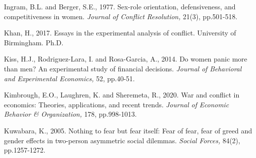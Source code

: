 \documentclass[12pt, letterpaper]{article}
\theoremstyle{plain}
\begin{document}
\begin{thebibliography}{10}



\bibitem{} Ingram, B.L. and Berger, S.E., 1977. Sex-role orientation, defensiveness, and competitiveness in women. \textit{Journal of Conflict Resolution,} 21(3), pp.501-518.


\bibitem{} Khan, H., 2017. Essays in the experimental analysis of conflict. University of Birmingham. Ph.D.

\bibitem{} Kiss, H.J., Rodriguez-Lara, I. and Rosa-Garcia, A., 2014. Do women panic more than men? An experimental study of financial decisions. \textit{Journal of Behavioral and Experimental Economics,} 52, pp.40-51.


\bibitem{} Kimbrough, E.O., Laughren, K. and Sheremeta, R., 2020. War and conflict in economics: Theories, applications, and recent trends. \textit{Journal of Economic Behavior \& Organization,} 178, pp.998-1013.

\bibitem{} Kuwabara, K., 2005. Nothing to fear but fear itself: Fear of fear, fear of greed and gender effects in two-person asymmetric social dilemmas. \textit{Social Forces,} 84(2), pp.1257-1272.






\end{thebibliography}
\end{document}
